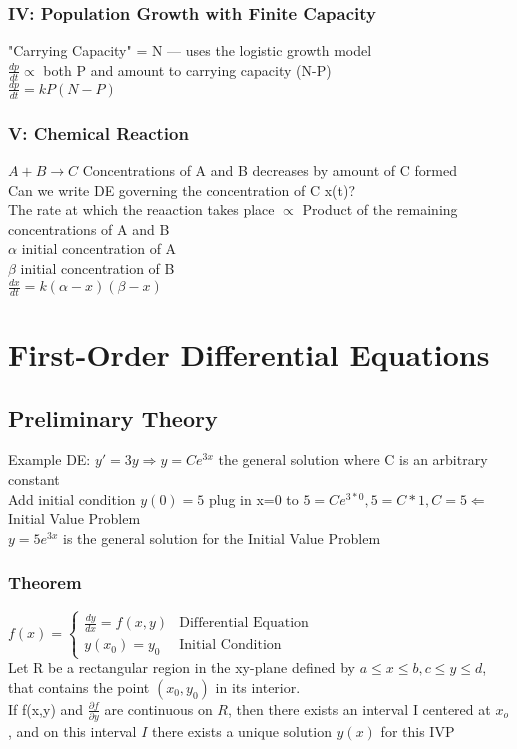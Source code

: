 \documentclass{article}
\begin{document}
\subsubsection*{IV: Population Growth with Finite Capacity}
"Carrying Capacity" = N — uses the logistic growth model\\
$\frac{dp}{dt} \propto $ both P and amount to carrying capacity (N-P)\\
$\frac{dp}{dt}=kP(N-P)$
\subsubsection*{V: Chemical Reaction}
$A+B\rightarrow C$ Concentrations of A and B decreases by amount of C formed \\ 
Can we write DE governing the concentration of C x(t)? \\ 
The rate at which the reaaction takes place $\propto$ Product of the remaining concentrations of A and B
\\ $\alpha$ initial concentration of A
\\ $\beta$ initial concentration of B
\\ $\frac{dx}{dt} = k(\alpha - x)(\beta - x)$
\section{First-Order Differential Equations}
\subsection{Preliminary Theory}
Example DE: $y'=3y \Rightarrow \boxed{y=Ce^{3x}}$ the general solution where C is an arbitrary constant
\\[0.05in]Add initial condition $y(0) = 5$ plug in x=0 to $5=Ce^{3*0}, 5=C*1, C=5 \Leftarrow$ Initial Value Problem
\\$y=5e^{3x}$ is the general solution for the Initial Value Problem\\\subsubsection{\textbf{Theorem}}
$f(x) = \begin{cases}
    \frac{dy}{dx} = f(x,y) & \text{Differential Equation}\\
    y(x_0) = y_0  & \text{Initial Condition}
    \end{cases}$\\ Let R be a rectangular region in the xy-plane defined by $a\leq x \leq b, c \leq y \leq d $, that contains the point $(x_0, y_0)$ in its interior. \\[0.1in] If f(x,y) and $\frac{\partial f}{\partial y}$ are continuous on $R$, then there exists an interval I centered at $x_o$, and on this interval $I$ there exists a unique solution $y(x)$ for this IVP\\
\end{document}
